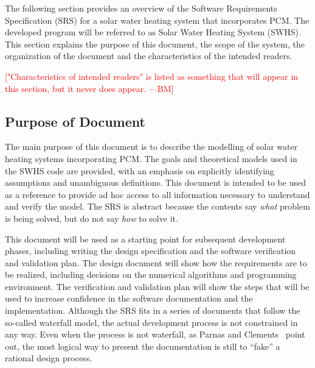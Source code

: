 \documentclass[12pt]{article}
\newcommand{\authornote}[3]{\textcolor{#1}{[#3 ---#2]}}
\newcommand{\authornote}[3]{}
\newcommand{\bmac}[1]{\authornote{red}{BM}{#1}}
\newcommand{\progname}{SWHS}
\begin{document}




The following section provides an overview of the Software Requirements
Specification (SRS) for a solar water heating system that incorporates PCM.  The
developed program will be referred to as Solar Water Heating System 
(\progname{}).  This section explains the purpose of this document, the scope 
of the system, the organization of the document and the characteristics of the 
intended readers.

\bmac{"Characteristics of intended readers" is listed as something that will appear in this section, but it never does appear.}

\subsection{Purpose of Document}

The main purpose of this document is to describe the modelling of solar water
heating systems incorporating PCM.  The goals and theoretical models used in the 
\progname{} code are provided, with an emphasis on explicitly identifying 
assumptions and unambiguous definitions.  This document is intended to be used 
as a reference to provide ad hoc access to all information necessary to 
understand and verify the model.  The SRS is abstract because the contents say
\emph{what} problem is being solved, but do not say \emph{how} to solve it.

This document will be used as a starting point for subsequent development
phases, including writing the design specification and the software verification
and validation plan.  The design document will show how the requirements are to
be realized, including decisions on the numerical algorithms and programming
environment.  The verification and validation plan will show the steps that will
be used to increase confidence in the software documentation and the
implementation.  Although the SRS fits in a series of documents that follow the
so-called waterfall model, the actual development process is not constrained in
any way.  Even when the process is not waterfall, as Parnas and
Clements~\cite{ParnasAndClements1986} point out, the most logical way to present
the documentation is still to ``fake'' a rational design process.
\end{document}

